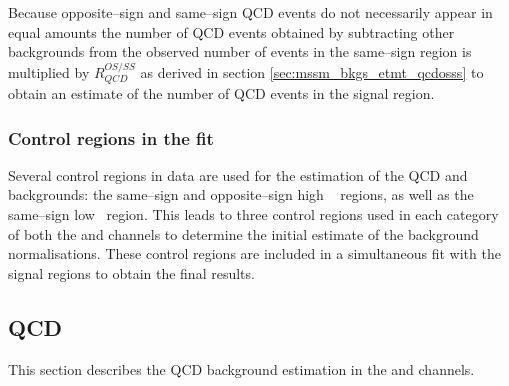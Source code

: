 Because opposite--sign and same--sign QCD events do not
necessarily appear in equal amounts the number of QCD
events obtained by subtracting other backgrounds from the
observed number of events in the same--sign region is multiplied
by $R_{QCD}^{OS/SS}$ as derived in section \ref{sec:mssm_bkgs_etmt_qcdosss} 
to obtain an estimate of the number of QCD events in the signal region.

\subsubsection{Control regions in the fit}
\label{sec:mssm_bkgs_etmt_ctrl}
Several control regions in data are used for the estimation
of the QCD and \Wjets backgrounds: the same--sign and 
opposite--sign high \mT~ regions, as well as the same--sign
low \mT~region. This leads to three control regions used 
in each category of both the \mutau and \etau channels to determine
the initial estimate of the background normalisations.
These control regions are included in a simultaneous fit
with the signal regions to obtain the final results.


\subsection{QCD}
\label{sec:mssm_bkgs_qcd}
This section describes the QCD background
estimation in the \tautau and \emu channels.

